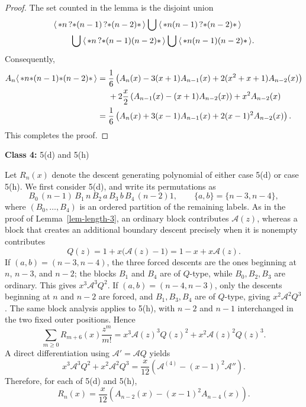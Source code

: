 \documentclass[11pt]{article}
\newcommand{\st}{\mbox{\ensuremath{\ast}}}
\newcommand{\+}{\mbox{\ensuremath{\scriptstyle{+}}}}
\newcommand{\glob}[1]{\ensuremath{\langle\, #1\,\rangle}}
\begin{document}
\begin{proof}
	The set counted in the lemma is the disjoint union
	\begin{align*}
		&\glob{\st n\,?\st(n-1)\,?\st(n-2)\st}
		\mathbin{\bigcup}\glob{\st n(n-1)\,?\st(n-2)\st}\\
		&\qquad\mathbin{\bigcup}\glob{\st n\,?\st(n-1)(n-2)\st}
		\mathbin{\bigcup}\glob{\st n(n-1)(n-2)\st}.
	\end{align*}
	Consequently,
	\begin{align*}
		A_n\glob{\st n\st(n-1)\st(n-2)\st}
		={}&\frac16\left(A_n(x)-3(x+1)A_{n-1}(x)+2(x^2+x+1)A_{n-2}(x)\right)\\
		&+2\frac{x}{2}\left(A_{n-1}(x)-(x+1)A_{n-2}(x)\right)+x^2A_{n-2}(x)\\
		={}&\frac16\left(A_n(x)+3(x-1)A_{n-1}(x)+2(x-1)^2A_{n-2}(x)\right).
	\end{align*}
	This completes the proof.
\end{proof}

\noindent \textbf{Class 4:} 5(d) and 5(h)

\begingroup
Let $R_n(x)$ denote the descent generating polynomial of either case 5(d) or case 5(h). We first consider 5(d), and write its permutations as
\[
B_0\,(n-1)\,B_1\,n\,B_2\,a\,B_3\,b\,B_4\,(n-2)1,
\qquad \{a,b\}=\{n-3,n-4\},
\]
where $(B_0,\ldots,B_4)$ is an ordered partition of the remaining labels. As in the proof of Lemma~\ref{lem-length-3}, an ordinary block contributes $\mathcal A(z)$, whereas a block that creates an additional boundary descent precisely when it is nonempty contributes
\[
Q(z)=1+x\bigl(\mathcal A(z)-1\bigr)=1-x+x\mathcal A(z).
\]
If $(a,b)=(n-3,n-4)$, the three forced descents are the ones beginning at $n$, $n-3$, and $n-2$; the blocks $B_1$ and $B_4$ are of $Q$-type, while $B_0,B_2,B_3$ are ordinary. This gives $x^3\mathcal A^3Q^2$. If $(a,b)=(n-4,n-3)$, only the descents beginning at $n$ and $n-2$ are forced, and $B_1,B_3,B_4$ are of $Q$-type, giving $x^2\mathcal A^2Q^3$. The same block analysis applies to 5(h), with $n-2$ and $n-1$ interchanged in the two fixed outer positions. Hence
\[
\sum_{m\geq0}R_{m+6}(x)\frac{z^m}{m!}
=x^3\mathcal A(z)^3Q(z)^2+x^2\mathcal A(z)^2Q(z)^3.
\]
A direct differentiation using $\mathcal A'=\mathcal A Q$ yields
\[
x^3\mathcal A^3Q^2+x^2\mathcal A^2Q^3
=\frac{x}{12}\left(\mathcal A^{(4)}-(x-1)^2\mathcal A''\right).
\]
Therefore, for each of 5(d) and 5(h),
\[
R_n(x)=\frac{x}{12}\left(A_{n-2}(x)-(x-1)^2A_{n-4}(x)\right).
\]
\endgroup
\end{document}
